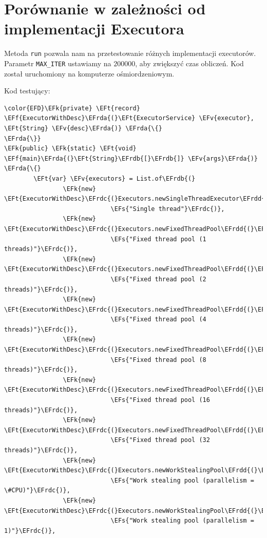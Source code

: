 \documentclass[11pt]{article}
\newcommand{\EFs}[1]{\textcolor{EFs}{#1}} %
\newcommand{\EFk}[1]{\textcolor{EFk}{#1}} %
\newcommand{\EFf}[1]{\textcolor{EFf}{#1}} %
\newcommand{\EFv}[1]{\textcolor{EFv}{#1}} %
\newcommand{\EFt}[1]{\textcolor{EFt}{#1}} %
\newcommand{\EFhn}[1]{\textcolor{EFhn}{#1}} %
\newcommand{\EFrda}[1]{#1} %
\newcommand{\EFrdb}[1]{\textcolor{EFrdb}{#1}} %
\newcommand{\EFrdc}[1]{\textcolor{EFrdc}{#1}} %
\newcommand{\EFrdd}[1]{\textcolor{EFrdd}{#1}} %
\begin{document}
\section*{Porównanie w zależności od implementacji Executora}
\label{sec:orgbdd40cc}
Metoda \texttt{run} pozwala nam na przetestowanie różnych implementacji executorów.
Parametr \texttt{MAX\_ITER} ustawiamy na \(200 000\), aby zwiększyć czas obliczeń.
Kod został uruchomiony na komputerze ośmiordzeniowym.

Kod testujący:
\begin{Code}
\begin{Verbatim}
\color{EFD}\EFk{private} \EFt{record} \EFf{ExecutorWithDesc}\EFrda{(}\EFt{ExecutorService} \EFv{executor}, \EFt{String} \EFv{desc}\EFrda{)} \EFrda{\{}
\EFrda{\}}
\EFk{public} \EFk{static} \EFt{void} \EFf{main}\EFrda{(}\EFt{String}\EFrdb{[}\EFrdb{]} \EFv{args}\EFrda{)} \EFrda{\{}
        \EFt{var} \EFv{executors} = List.of\EFrdb{(}
                \EFk{new} \EFt{ExecutorWithDesc}\EFrdc{(}Executors.newSingleThreadExecutor\EFrdd{(}\EFrdd{)},
                             \EFs{"Single thread"}\EFrdc{)},
                \EFk{new} \EFt{ExecutorWithDesc}\EFrdc{(}Executors.newFixedThreadPool\EFrdd{(}\EFhn{1}\EFrdd{)},
                             \EFs{"Fixed thread pool (1 threads)"}\EFrdc{)},
                \EFk{new} \EFt{ExecutorWithDesc}\EFrdc{(}Executors.newFixedThreadPool\EFrdd{(}\EFhn{2}\EFrdd{)},
                             \EFs{"Fixed thread pool (2 threads)"}\EFrdc{)},
                \EFk{new} \EFt{ExecutorWithDesc}\EFrdc{(}Executors.newFixedThreadPool\EFrdd{(}\EFhn{4}\EFrdd{)},
                             \EFs{"Fixed thread pool (4 threads)"}\EFrdc{)},
                \EFk{new} \EFt{ExecutorWithDesc}\EFrdc{(}Executors.newFixedThreadPool\EFrdd{(}\EFhn{8}\EFrdd{)},
                             \EFs{"Fixed thread pool (8 threads)"}\EFrdc{)},
                \EFk{new} \EFt{ExecutorWithDesc}\EFrdc{(}Executors.newFixedThreadPool\EFrdd{(}\EFhn{16}\EFrdd{)},
                             \EFs{"Fixed thread pool (16 threads)"}\EFrdc{)},
                \EFk{new} \EFt{ExecutorWithDesc}\EFrdc{(}Executors.newFixedThreadPool\EFrdd{(}\EFhn{32}\EFrdd{)},
                             \EFs{"Fixed thread pool (32 threads)"}\EFrdc{)},
                \EFk{new} \EFt{ExecutorWithDesc}\EFrdc{(}Executors.newWorkStealingPool\EFrdd{(}\EFrdd{)},
                             \EFs{"Work stealing pool (parallelism = \#CPU)"}\EFrdc{)},
                \EFk{new} \EFt{ExecutorWithDesc}\EFrdc{(}Executors.newWorkStealingPool\EFrdd{(}\EFhn{1}\EFrdd{)},
                             \EFs{"Work stealing pool (parallelism = 1)"}\EFrdc{)},

\end{Verbatim}
\end{Code}
\end{document}
